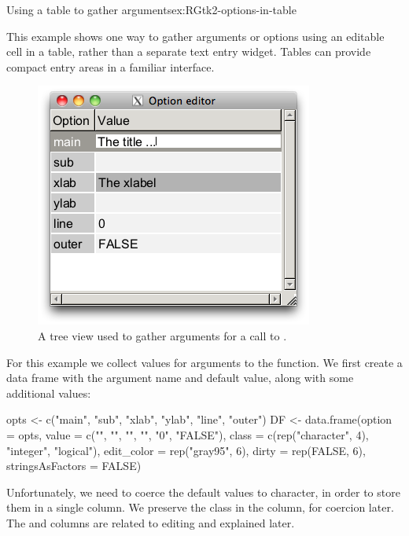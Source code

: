 \begin{example}{Using a table to gather arguments}{ex:RGtk2-options-in-table}

This example shows one way to gather arguments or options using an
editable cell in a table, rather than a separate text entry
widget. Tables can provide compact entry areas in a familiar
interface.

\begin{figure}
  \centering
  \includegraphics[width=.5\textwidth]{fig-RGtk2-option-editor.png}
  \caption{A tree view used to gather arguments for a call to .}
  \label{fig:RGtk2-option-editor}
\end{figure}

For this example we collect values for arguments to the
 function. We first create a data frame with the
argument name and default value, along with some additional values:
\begin{Schunk}
\begin{Sinput}
 opts <- c("main", "sub", "xlab", "ylab", "line", "outer")
 DF <- data.frame(option = opts,
            value = c("", "", "", "", "0", "FALSE"),
            class = c(rep("character", 4), "integer", "logical"),
            edit_color = rep("gray95", 6),
            dirty = rep(FALSE, 6),
            stringsAsFactors = FALSE)
\end{Sinput}
\end{Schunk}
%
Unfortunately, we need to coerce the default values to character, in
order to store them in a single column. We preserve the class in the
 column, for coercion later. The  and
 columns are related to editing and explained later.
%


\end{example}
